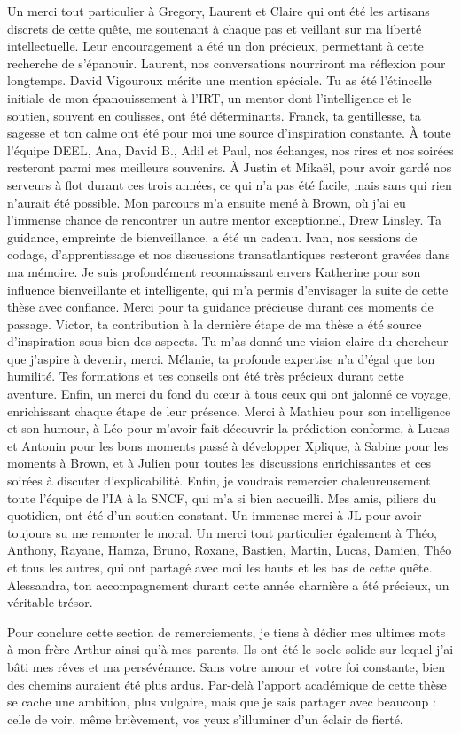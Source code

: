 Un merci tout particulier à Gregory, Laurent et Claire qui ont été les artisans discrets de cette quête, me soutenant à chaque pas et veillant sur ma liberté intellectuelle. Leur encouragement a été un don précieux, permettant à cette recherche de s'épanouir. Laurent, nos conversations nourriront ma réflexion pour longtemps.
David Vigouroux mérite une mention spéciale. Tu as été l'étincelle initiale de mon épanouissement à l'IRT, un mentor dont l'intelligence et le soutien, souvent en coulisses, ont été déterminants. Franck, ta gentillesse, ta sagesse et ton calme ont été pour moi une source d'inspiration constante.
À toute l'équipe DEEL, Ana, David B., Adil et Paul, nos échanges, nos rires et nos soirées resteront parmi mes meilleurs souvenirs. À Justin et Mikaël, pour avoir gardé nos serveurs à flot durant ces trois années, ce qui n'a pas été facile, mais sans qui rien n'aurait été possible.
Mon parcours m'a ensuite mené à Brown, où j'ai eu l'immense chance de rencontrer un autre mentor exceptionnel, Drew Linsley. Ta guidance, empreinte de bienveillance, a été un cadeau. Ivan, nos sessions de codage, d'apprentissage et nos discussions transatlantiques resteront gravées dans ma mémoire.
Je suis profondément reconnaissant envers Katherine pour son influence bienveillante et intelligente, qui m’a permis d’envisager la suite de cette thèse avec confiance. Merci pour ta guidance précieuse durant ces moments de passage.
Victor, ta contribution à la dernière étape de ma thèse a été source d'inspiration sous bien des aspects. Tu m'as donné une vision claire du chercheur que j'aspire à devenir, merci. Mélanie, ta profonde expertise n'a d'égal que ton humilité. Tes formations et tes conseils ont été très précieux durant cette aventure.
Enfin, un merci du fond du cœur à tous ceux qui ont jalonné ce voyage, enrichissant chaque étape de leur présence. Merci à Mathieu pour son intelligence et son humour, à Léo pour m'avoir fait découvrir la prédiction conforme, à Lucas et Antonin pour les bons moments passé à développer Xplique, à Sabine pour les moments à Brown, et à Julien pour toutes les discussions enrichissantes et ces soirées à discuter d'explicabilité. Enfin, je voudrais remercier chaleureusement toute l'équipe de l'IA à la SNCF, qui m'a si bien accueilli.
Mes amis, piliers du quotidien, ont été d'un soutien constant. Un immense merci à JL pour avoir toujours su me remonter le moral. Un merci tout particulier également à Théo, Anthony, Rayane, Hamza, Bruno, Roxane, Bastien, Martin, Lucas, Damien, Théo et tous les autres, qui ont partagé avec moi les hauts et les bas de cette quête. Alessandra, ton accompagnement durant cette année charnière a été précieux, un véritable trésor.

Pour conclure cette section de remerciements, je tiens à dédier mes ultimes mots à mon frère Arthur ainsi qu'à mes parents. Ils ont été le socle solide sur lequel j'ai bâti mes rêves et ma persévérance. Sans votre amour et votre foi constante, bien des chemins auraient été plus ardus. Par-delà l'apport académique de cette thèse se cache une ambition, plus vulgaire, mais que je sais partager avec beaucoup : celle de voir, même brièvement, vos yeux s'illuminer d'un éclair de fierté.
